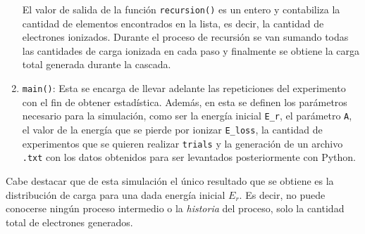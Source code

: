 \begin{enumerate}[label=\arabic*., listparindent=1.5em]
    \indent El valor de salida de la función \verb|recursion()| es un entero y contabiliza la cantidad de elementos encontrados en la lista, es decir, la cantidad de electrones ionizados. Durante el proceso de recursión se van sumando todas las cantidades de carga ionizada en cada paso y finalmente se obtiene la carga total generada durante la cascada.
    \item \verb|main()|: Esta se encarga de llevar adelante las repeticiones del experimento con el fin de obtener estadística. Además, en esta se definen los parámetros necesario para la simulación, como ser la energía inicial \verb|E_r|, el parámetro \verb|A|, el valor de la energía que se pierde por ionizar \verb|E_loss|, la cantidad de experimentos que se quieren realizar \verb|trials| y la generación de un archivo \verb|.txt| con los datos obtenidos para ser levantados posteriormente con Python.
\end{enumerate}
Cabe destacar que de esta simulación el único resultado que se obtiene es la distribución de carga para una dada energía inicial $E_{r}$. Es decir, no puede conocerse ningún proceso intermedio o la \textit{historia} del proceso, solo la cantidad total de electrones generados.

